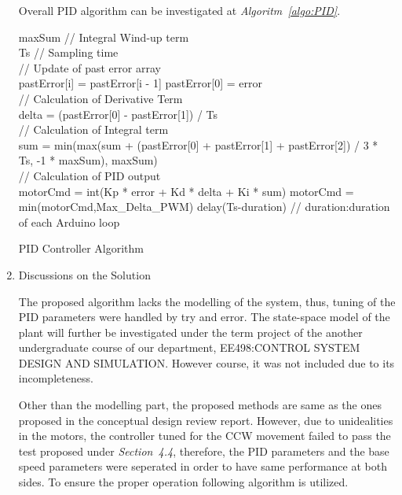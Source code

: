 \documentclass[a4paper,12pt]{article}
\begin{document}
\begin{enumerate}
	Overall PID algorithm can be investigated at \textit{Algoritm~\ref{algo:PID}}.
	
	\begin{algorithm}
		\DontPrintSemicolon	
		maxSum // Integral Wind-up term \\
		Ts // Sampling time \\
		// Update of past error array \\
		 {
			pastError[i] = pastError[i - 1] 
		} 
		pastError[0] = error \\
		// Calculation of Derivative Term \\
		delta = (pastError[0] - pastError[1]) / Ts \\
		// Calculation of Integral term \\
		sum = min(max(sum + (pastError[0] + pastError[1] + pastError[2]) / 3 * Ts, -1 * maxSum), maxSum) \\
		// Calculation of PID output \\
		motorCmd = int(Kp * error + Kd * delta + Ki * sum)		
		motorCmd =  min(motorCmd,Max\_Delta\_PWM)
		delay(Ts-duration) // duration:duration of each Arduino loop	
		\caption{PID Controller Algorithm}
		\label{algo:PID}
	\end{algorithm}

	\item {Discussions on the Solution}
	
	The proposed algorithm lacks the modelling of the system, thus, tuning of the PID parameters were handled by try and error. The state-space model of the plant will further be investigated under the term project of the another undergraduate course of our department, EE498:CONTROL SYSTEM DESIGN AND SIMULATION. However course, it was not included due to its incompleteness.	
	
	Other than the modelling part, the proposed methods are same as the ones proposed in the conceptual design review report. However, due to unidealities in the motors, the controller tuned for the CCW movement failed to pass the test proposed under \textit{Section~4.4}, therefore, the PID parameters and the base speed parameters were seperated in order to have same performance at both sides. To ensure the proper operation following algorithm is utilized.
	
	
	 


\end{enumerate}
\end{document}
